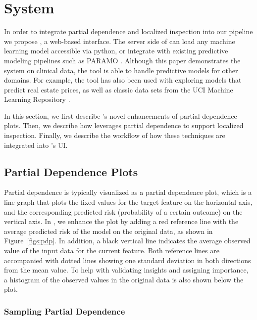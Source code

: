 


\section{System}
In order to integrate partial dependence and localized inspection into our pipeline we propose
\prospector, a web-based interface.  The server side of \prospector can load any machine learning model accessible via python, or integrate with existing predictive modeling pipelines such as PARAMO \cite{paramo}.
Although this paper demonstrates the system on clinical data, the tool is able to handle predictive models for other domains.  For example, the tool has also been used with exploring models that predict real estate prices, as well as classic data sets from the UCI Machine Learning Repository \cite{Lichman:2013}.

In this section, we first describe \prospector's novel enhancements of partial dependence plots.  Then, we describe how \prospector leverages partial dependence to support localized inspection.  Finally, we describe the workflow of how these techniques are integrated into \prospector's UI.
\subsection{Partial Dependence Plots}

Partial dependence is typically visualized as a partial dependence plot, which is a line graph that plots the fixed values for the target feature on the horizontal axis, and the corresponding predicted risk (probability of a certain outcome) on the vertical axis.  In \prospector, we enhance the plot by adding a red reference line with the average predicted risk of the model on the original data, as shown in Figure~\ref{figs:pdp}.  In addition, a black vertical line indicates the average observed value of the input data for the current feature.  Both reference lines are accompanied with dotted lines showing one standard deviation in both directions from the  mean value.  To help with validating insights and assigning importance, a histogram of the observed values in the original data is also shown below the plot.

\subsubsection{Sampling Partial Dependence}

